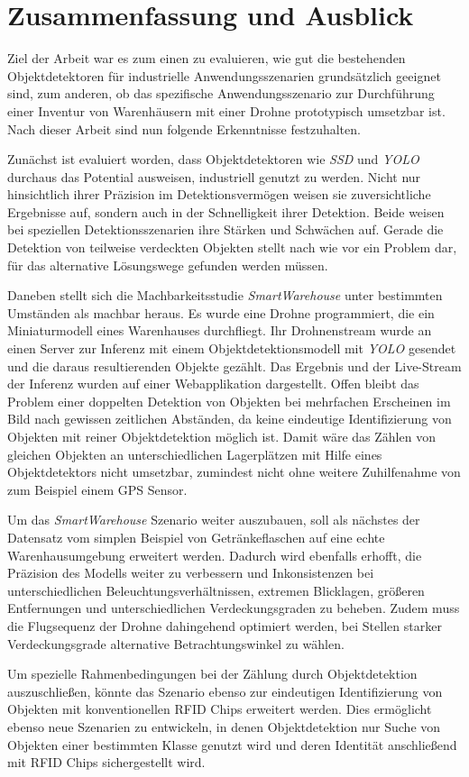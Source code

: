 \chapter{Zusammenfassung und Ausblick}

Ziel der Arbeit war es zum einen zu evaluieren, wie gut die bestehenden Objektdetektoren für industrielle Anwendungsszenarien grundsätzlich geeignet sind, zum anderen, ob das spezifische Anwendungsszenario zur Durchführung einer Inventur von Warenhäusern mit einer Drohne prototypisch umsetzbar ist. Nach dieser Arbeit sind nun folgende Erkenntnisse festzuhalten.

Zunächst ist evaluiert worden, dass Objektdetektoren wie \textit{SSD} und \textit{YOLO} durchaus das Potential ausweisen, industriell genutzt zu werden. Nicht nur hinsichtlich ihrer Präzision im Detektionsvermögen weisen sie zuversichtliche Ergebnisse auf, sondern auch in der Schnelligkeit ihrer Detektion. Beide weisen bei speziellen Detektionsszenarien ihre Stärken und Schwächen auf. Gerade die Detektion von teilweise verdeckten Objekten stellt nach wie vor ein Problem dar, für das alternative Lösungswege gefunden werden müssen. 

Daneben stellt sich die Machbarkeitsstudie \textit{SmartWarehouse} unter bestimmten Umständen als machbar heraus. Es wurde eine Drohne programmiert, die ein Miniaturmodell eines Warenhauses durchfliegt. Ihr Drohnenstream wurde an einen Server zur Inferenz mit einem Objektdetektionsmodell mit \textit{YOLO} gesendet und die daraus resultierenden Objekte gezählt. Das Ergebnis und der Live-Stream der Inferenz wurden auf einer Webapplikation dargestellt. Offen bleibt das Problem einer doppelten Detektion von Objekten bei mehrfachen Erscheinen im Bild nach gewissen zeitlichen Abständen, da keine eindeutige Identifizierung von Objekten mit reiner Objektdetektion möglich ist. Damit wäre das Zählen von gleichen Objekten an unterschiedlichen Lagerplätzen mit Hilfe eines Objektdetektors nicht umsetzbar, zumindest nicht ohne weitere Zuhilfenahme von zum Beispiel einem GPS Sensor.

Um das \textit{SmartWarehouse} Szenario weiter auszubauen, soll als nächstes der Datensatz vom simplen Beispiel von Getränkeflaschen auf eine echte Warenhausumgebung erweitert werden. Dadurch wird ebenfalls erhofft, die Präzision des Modells weiter zu verbessern und Inkonsistenzen bei unterschiedlichen Beleuchtungsverhältnissen, extremen Blicklagen, größeren Entfernungen und unterschiedlichen Verdeckungsgraden zu beheben. Zudem muss die Flugsequenz der Drohne dahingehend optimiert werden, bei Stellen starker Verdeckungsgrade alternative Betrachtungswinkel zu wählen. 

Um spezielle Rahmenbedingungen bei der Zählung durch Objektdetektion auszuschließen, könnte das Szenario ebenso zur eindeutigen Identifizierung von Objekten mit konventionellen RFID Chips erweitert werden. Dies ermöglicht ebenso neue Szenarien zu entwickeln, in denen Objektdetektion nur Suche von Objekten einer bestimmten Klasse genutzt wird und deren Identität anschließend mit RFID Chips sichergestellt wird. 